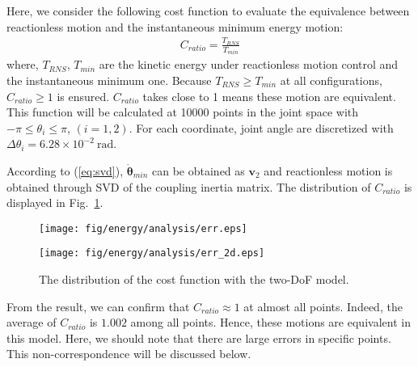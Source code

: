 \documentclass[preprint,12pt]{elsarticle}
\def\fig#1{{Fig.~\ref{fig:#1}}}
\def\eq#1{{(\ref{eq:#1})}}
\def\thd{{\dot{\bbm{\theta}}}}
\def\unit#1{{~\mathrm{#1}}}
\def\bbm#1{\bm{#1}}
\begin{document}
Here, we consider the following cost function to evaluate the equivalence between
reactionless motion and the instantaneous minimum energy motion:
%
\begin{align}
  C_{ratio} = \frac{T_{RNS}}{T_{min}}
\end{align}
%
where, $T_{RNS}$, $T_{min}$ are the kinetic energy under
reactionless motion control and the instantaneous minimum one.
Because $T_{RNS} \geq T_{min}$ at all configurations,
$C_{ratio} \geq 1$ is ensured.
$C_{ratio}$ takes close to 1 means these motion are equivalent.
This function will be calculated at 10000 points in the joint space with $-\pi \leq \theta_{i} \leq \pi$, $(i = 1,2)$.
For each coordinate, joint angle are discretized with $\Delta \theta_{i} = 6.28\times 10^{-2}\unit{rad}$.

According to \eq{svd},
$\thd_{min}$ can be obtained as $\bm{v}_{2}$ and reactionless motion
is obtained through SVD of the coupling inertia matrix.
The distribution of $C_{ratio}$ is displayed in \fig{dist_2D}.
%
\begin{figure}[t]
  \centering
  \begin{minipage}{0.49\linewidth}
    \centering
    \texttt{[image: fig/energy/analysis/err.eps]}
  \end{minipage}
  \begin{minipage}{0.37\linewidth}
    \centering
    \texttt{[image: fig/energy/analysis/err\_2d.eps]}
  \end{minipage}
  \caption{The distribution of the cost function with the two-DoF model.}
  \label{fig:dist_2D}
\end{figure}
%
From the result,
we can confirm that $C_{ratio} \approx 1$ at almost all points.
Indeed, the average of $C_{ratio}$ is $1.002$ among all points.
Hence, these motions are equivalent in this model.
Here, we should note that there are large errors in specific points.
This non-correspondence will be discussed below.
\end{document}
